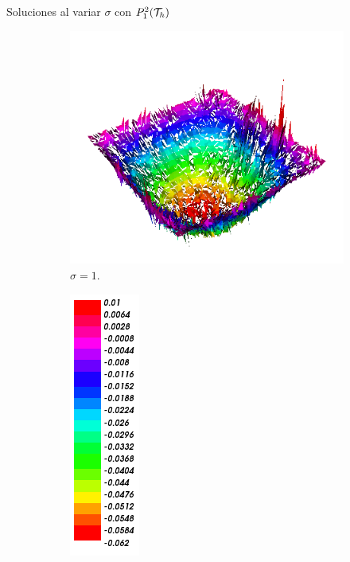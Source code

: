 \begin{frame}{Soluciones al variar $\sigma$ con $\relax{P}_1^2(\mathcal{T}_h)$}
\begin{figure}[h!]
\begin{subfigure}[b]{0.27\textwidth}
				\centering
				\includegraphics[scale=0.20]{img/Difusion/Recortes/steady_diffusion_approx_sigma_1.png}
				\caption{$\sigma=1$.}
			\end{subfigure}
			\begin{subfigure}[b]{0.15\textwidth}
				\centering
				\includegraphics[scale=0.25]{img/Difusion/Recortes/steady_diffusion_values.png}
			\end{subfigure}
			\begin{subfigure}[b]{0.27\textwidth}
				\centering

\end{subfigure}
\end{figure}
\end{frame}
